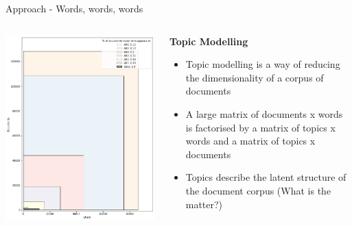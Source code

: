 \documentclass[9pt]{beamer}
\begin{document}
\begin{frame}{Approach - Words, words, words}

\begin{columns}
	\begin{column}{0.5\linewidth}
		\begin{center}
			\includegraphics[width=\linewidth]{../plots/volume_variety_bible_AR6}
		\end{center}
	\end{column}
	\begin{column}{0.5\linewidth}
		\textbf{Topic Modelling}
		\begin{center}
			\begin{itemize}
				\item Topic modelling is a way of reducing the dimensionality of a corpus of documents
				\item A large matrix of documents x words is factorised by
				a matrix of topics x words and a matrix of topics x documents
			\citep{Lee1999}
				\item Topics describe the latent structure of the document corpus (What is the matter?)
				
			\end{itemize}
		\end{center}
	\end{column}
\end{columns}

\end{frame}
\end{document}
